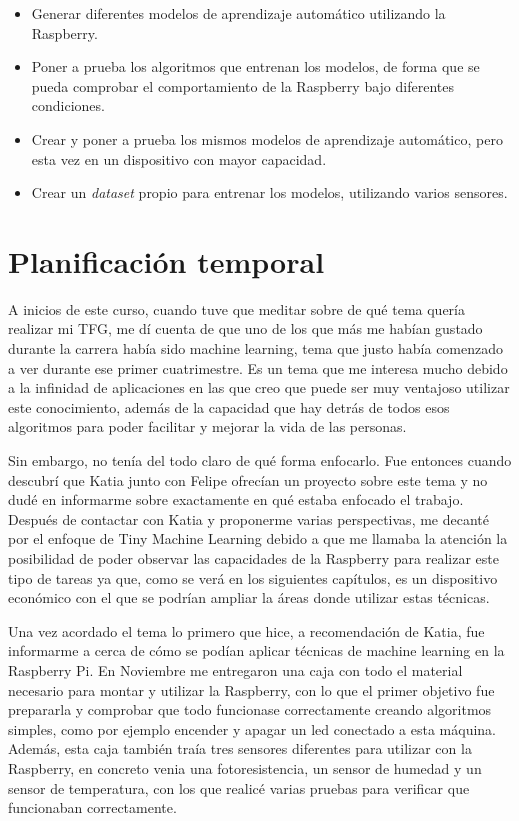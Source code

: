\documentclass[a4paper, 12pt]{book}
\begin{document}
    \begin{itemize}
        \item Generar diferentes modelos de aprendizaje automático utilizando la Raspberry.
        \item Poner a prueba los algoritmos que entrenan los modelos, de forma que se pueda comprobar el comportamiento de la Raspberry bajo diferentes condiciones.
        \item Crear y poner a prueba los mismos modelos de aprendizaje automático, pero esta vez en un dispositivo con mayor capacidad.
        \item Crear un \textit{dataset} propio para entrenar los modelos, utilizando varios sensores.
    \end{itemize}

\section{Planificación temporal}
\label{sec:planificacion-temporal}

A inicios de este curso, cuando tuve que meditar sobre de qué tema quería realizar mi TFG, me dí cuenta de que uno de los que más me habían gustado durante la carrera había sido machine learning, tema que justo había comenzado a ver durante ese primer cuatrimestre. Es un tema que me interesa mucho debido a la infinidad de aplicaciones en las que creo que puede ser muy ventajoso utilizar este conocimiento, además de la capacidad que hay detrás de todos esos algoritmos para poder facilitar y mejorar la vida de las personas.

Sin embargo, no tenía del todo claro de qué forma enfocarlo. Fue entonces cuando descubrí que Katia junto con Felipe ofrecían un proyecto sobre este tema y no dudé en informarme sobre exactamente en qué estaba enfocado el trabajo. Después de contactar con Katia y proponerme varias perspectivas, me decanté por el enfoque de Tiny Machine Learning debido a que me llamaba la atención la posibilidad de poder observar las capacidades de la Raspberry para realizar este tipo de tareas ya que, como se verá en los siguientes capítulos, es un dispositivo económico con el que se podrían ampliar la áreas donde utilizar estas técnicas.

Una vez acordado el tema lo primero que hice, a recomendación de Katia, fue informarme a cerca de cómo se podían aplicar técnicas de machine learning en la Raspberry Pi. En Noviembre me entregaron una caja con todo el material necesario para montar y utilizar la Raspberry, con lo que el primer objetivo fue prepararla y comprobar que todo funcionase correctamente creando algoritmos simples, como por ejemplo encender y apagar un led conectado a esta máquina. Además, esta caja también traía tres sensores diferentes para utilizar con la Raspberry, en concreto venia una fotoresistencia, un sensor de humedad y un sensor de temperatura, con los que realicé varias pruebas para verificar que funcionaban correctamente.
\end{document}
